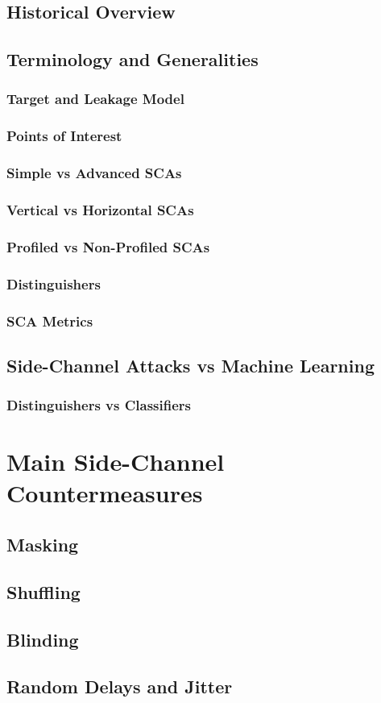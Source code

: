 \subsection{Historical Overview}

\subsection{Terminology and Generalities}
\subsubsection{Target and Leakage Model}
\subsubsection{Points of Interest}
\subsubsection{Simple vs Advanced SCAs}
\subsubsection{Vertical vs Horizontal SCAs}
\subsubsection{Profiled vs Non-Profiled SCAs}
\subsubsection{Distinguishers}
\subsubsection{SCA Metrics}

\subsection{Side-Channel Attacks vs Machine Learning}
\subsubsection{Distinguishers vs Classifiers}


\section{Main Side-Channel Countermeasures}
\subsection{Masking}
\subsection{Shuffling}
\subsection{Blinding}
\subsection{Random Delays and Jitter}